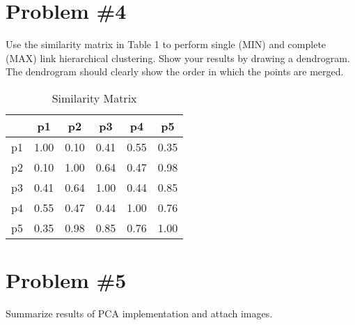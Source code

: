 \documentclass[12pt]{article}
\begin{document}
	\section*{Problem \#4}
	Use the similarity matrix in Table 1 to perform single
	(MIN) and complete (MAX) link hierarchical clustering. Show your results by drawing a
	dendrogram. The dendrogram should clearly show the order in which the points are merged.
	\begin{table}[H]
		\centering
		\caption{Similarity Matrix}
		\begin{tabular}{c|c|c|c|c|c}
			& \textbf{p1} & \textbf{p2} & \textbf{p3} & \textbf{p4} & \textbf{p5} \\
			\hline
			p1 & 1.00 & 0.10 & 0.41 & 0.55 & 0.35 \\
			p2 & 0.10 & 1.00 & 0.64 & 0.47 & 0.98 \\
			p3 & 0.41 & 0.64 & 1.00 & 0.44 & 0.85 \\
			p4 & 0.55 & 0.47 & 0.44 & 1.00 & 0.76 \\
			p5 & 0.35 & 0.98 & 0.85 & 0.76 & 1.00 \\
			\hline
		\end{tabular}
	\end{table}
	
	\section*{Problem \#5}
	Summarize results of PCA implementation and attach images.
	
	
	
\end{document}
